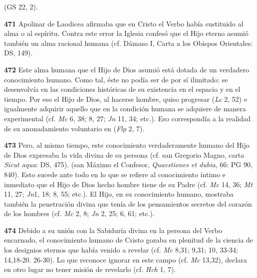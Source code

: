  (GS 22, 2).

\textbf{471} Apolinar de Laodicea afirmaba que en Cristo el Verbo había sustituido al alma o al espíritu. Contra este error la Iglesia confesó que el Hijo eterno asumió también un alma racional humana (cf. Dámaso I, Carta a los Obispos Orientales: DS, 149).

\textbf{472} Este alma humana que el Hijo de Dios asumió está dotada de un verdadero conocimiento humano. Como tal, éste no podía ser de por sí ilimitado: se desenvolvía en las condiciones históricas de su existencia en el espacio y en el tiempo. Por eso el Hijo de Dios, al hacerse hombre, quiso progresar  (\emph{Lc} 2, 52) e igualmente adquirir aquello que en la condición humana se adquiere de manera experimental (cf. \emph{Mc} 6, 38; 8, 27; \emph{Jn} 11, 34; etc.). Eso correspondía a la realidad de su anonadamiento voluntario en  (\emph{Flp} 2, 7).

\textbf{473} Pero, al mismo tiempo, este conocimiento verdaderamente humano del Hijo de Dios expresaba la vida divina de su persona (cf. san Gregorio Magno, carta \emph{Sicut aqua}: DS, 475).  (san Máximo el Confesor, \emph{Quaestiones et dubia}, 66: PG 90, 840). Esto sucede ante todo en lo que se refiere al conocimiento íntimo e inmediato que el Hijo de Dios hecho hombre tiene de su Padre (cf. \emph{Mc} 14, 36; \emph{Mt} 11, 27; \emph{Jn}1, 18; 8, 55; etc.). El Hijo, en su conocimiento humano, mostraba también la penetración divina que tenía de los pensamientos secretos del corazón de los hombres (cf. \emph{Mc} 2, 8; \emph{Jn} 2, 25; 6, 61; etc.).

\textbf{474} Debido a su unión con la Sabiduría divina en la persona del Verbo encarnado, el conocimiento humano de Cristo gozaba en plenitud de la ciencia de los designios eternos que había venido a revelar (cf. \emph{Mc} 8,31; 9,31; 10, 33-34; 14,18-20. 26-30). Lo que reconoce ignorar en este campo (cf. \emph{Mc} 13,32), declara en otro lugar no tener misión de revelarlo (cf. \emph{Hch} 1, 7).

